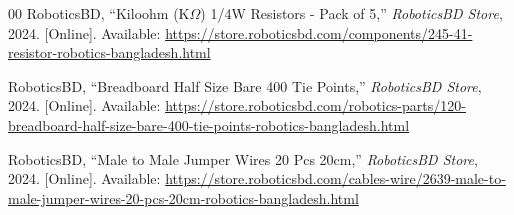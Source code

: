 \documentclass[conference]{IEEEtran}
\begin{document}
\begin{thebibliography}{00}
RoboticsBD, ``Kiloohm (K$\Omega$) 1/4W Resistors - Pack of 5,'' \textit{RoboticsBD Store}, 2024. [Online]. Available: \url{https://store.roboticsbd.com/components/245-41-resistor-robotics-bangladesh.html}

RoboticsBD, ``Breadboard Half Size Bare 400 Tie Points,'' \textit{RoboticsBD Store}, 2024. [Online]. Available: \url{https://store.roboticsbd.com/robotics-parts/120-breadboard-half-size-bare-400-tie-points-robotics-bangladesh.html}

RoboticsBD, ``Male to Male Jumper Wires 20 Pcs 20cm,'' \textit{RoboticsBD Store}, 2024. [Online]. Available: \url{https://store.roboticsbd.com/cables-wire/2639-male-to-male-jumper-wires-20-pcs-20cm-robotics-bangladesh.html}
\end{thebibliography}
\end{document}
